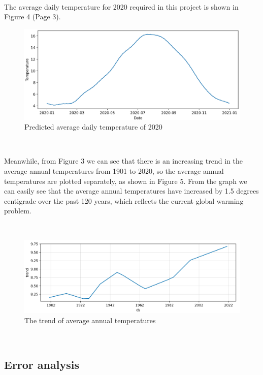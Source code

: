 \documentclass{article}
\begin{document}
\

The average daily temperature for 2020 required in this project is shown in Figure 4 (Page 3).

\newpage

\begin{figure}[htbp]
\centering
\includegraphics[width=13cm]{year2020.png} %
\caption{Predicted average daily temperature of 2020} %
\end{figure}

\

Meanwhile, from Figure 3 we can see that there is an increasing trend in the average annual temperatures from 1901 to 2020, so the average annual temperatures are plotted separately, as shown in Figure 5. From the graph we can easily see that the average annual temperatures have increased by 1.5 degrees centigrade over the past 120 years, which reflects the current global warming problem.

\

\begin{figure}[htbp]
\centering
\includegraphics[width=15cm]{trend.png} %
\caption{The trend of average annual temperatures} %
\end{figure}

\

\subsection{Error analysis}
\end{document}
